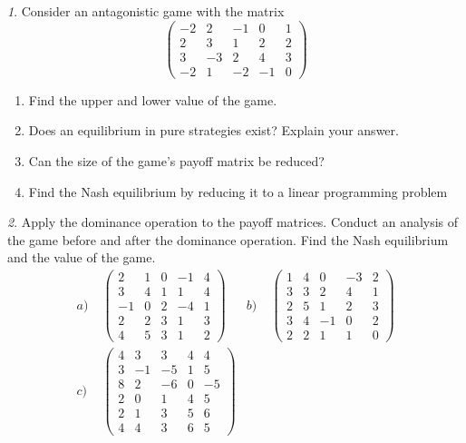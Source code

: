 \documentclass[12pt]{article}
\theoremstyle{remark}
\newtheorem{exercise}{}[subsection]
\begin{document}
\begin{exercise}
Consider an antagonistic game with the matrix
\[
	\begin{pmatrix}
	-2 & 2 & -1 & 0 & 1 \\
	2 & 3 & 1 & 2 & 2 \\
	3 & -3 & 2 & 4 & 3 \\
	-2 & 1 & -2 & -1 & 0
	\end{pmatrix}
\]
\begin{enumerate}
	\item Find the upper and lower value of the game.
	\item Does an equilibrium in pure strategies exist? Explain your answer.
	\item Can the size of the game's payoff matrix be reduced?
	\item Find the Nash equilibrium by reducing it to a linear
	programming problem %
\end{enumerate}
\end{exercise}

\begin{exercise}
Apply the dominance operation to the payoff matrices. Conduct an analysis of the game before and
after the dominance operation. Find the Nash equilibrium and the value of the game.
\begin{align*}
	a)&\;\begin{pmatrix} 2 & 1& 0 & -1 & 4 \\ 3 & 4 & 1 & 1 & 4 \\
	-1 & 0 & 2 & -4 & 1 \\ 2 & 2 & 3 & 1 & 3 \\ 4 & 5 & 3 & 1 & 2 \end{pmatrix} &
	b)&\; \begin{pmatrix} 1 & 4 & 0 & -3 & 2 \\ 3 & 3 & 2 & 4  & 1 \\ 2 & 5 & 1 & 2 & 3 \\ 
	3 & 4 & -1 & 0 & 2 \\ 2 & 2 & 1 & 1 & 0 \end{pmatrix} \\
	c)&\; \begin{pmatrix} 4 & 3 & 3 & 4 & 4 \\ 3 & -1 & -5 & 1 & 5 \\ 8 & 2 & -6 & 0 & -5 \\ 
	2 & 0 & 1 & 4 & 5 \\ 2 & 1 & 3 & 5 & 6 \\ 4 & 4 & 3 & 6 & 5 \end{pmatrix}
\end{align*}
\end{exercise}
\end{document}
